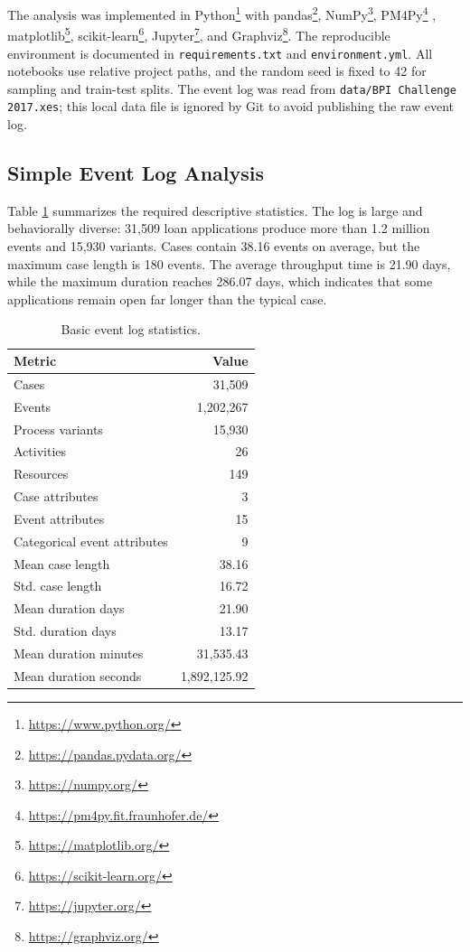 \documentclass[
  english,
  font=times,
  twocolumn,
]{tumarticle}
\begin{document}
The analysis was implemented in Python\footnote{\url{https://www.python.org/}} with pandas\footnote{\url{https://pandas.pydata.org/}}, NumPy\footnote{\url{https://numpy.org/}}, PM4Py\footnote{\url{https://pm4py.fit.fraunhofer.de/}} \cite{pm4py}, matplotlib\footnote{\url{https://matplotlib.org/}}, scikit-learn\footnote{\url{https://scikit-learn.org/}}, Jupyter\footnote{\url{https://jupyter.org/}}, and Graphviz\footnote{\url{https://graphviz.org/}}.
The reproducible environment is documented in \texttt{requirements.txt} and \texttt{environment.yml}.
All notebooks use relative project paths, and the random seed is fixed to 42 for sampling and train-test splits.
The event log was read from \texttt{data/BPI Challenge 2017.xes}; this local data file is ignored by Git to avoid publishing the raw event log.

\subsection{Simple Event Log Analysis}

Table \ref{tab:logstats} summarizes the required descriptive statistics.
The log is large and behaviorally diverse: 31,509 loan applications produce more than 1.2 million events and 15,930 variants.
Cases contain 38.16 events on average, but the maximum case length is 180 events.
The average throughput time is 21.90 days, while the maximum duration reaches 286.07 days, which indicates that some applications remain open far longer than the typical case.

\begin{table}[t]
    \caption{Basic event log statistics.}
    \centering
    \small
    \begin{tabular}{lr}
        \toprule
        \textbf{Metric} & \textbf{Value} \\
        \midrule
        Cases & 31,509 \\
        Events & 1,202,267 \\
        Process variants & 15,930 \\
        Activities & 26 \\
        Resources & 149 \\
        Case attributes & 3 \\
        Event attributes & 15 \\
        Categorical event attributes & 9 \\
        Mean case length & 38.16 \\
        Std. case length & 16.72 \\
        Mean duration days & 21.90 \\
        Std. duration days & 13.17 \\
        Mean duration minutes & 31,535.43 \\
        Mean duration seconds & 1,892,125.92 \\
        \bottomrule
    \end{tabular}
    \label{tab:logstats}
\end{table}
\end{document}
